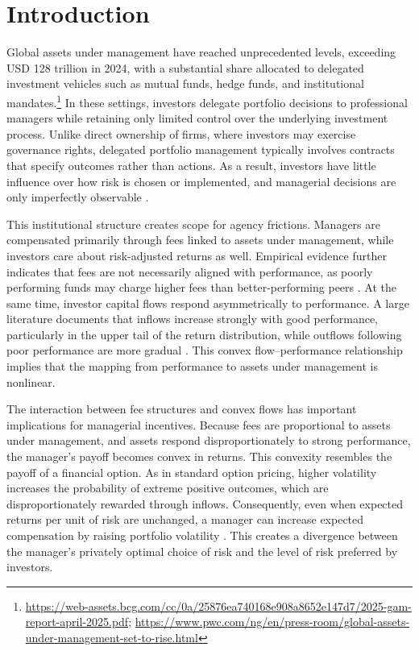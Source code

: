 \section{Introduction}\label{sec:introduction}

Global assets under management have reached unprecedented levels,
exceeding USD 128 trillion in 2024, with a substantial share allocated
to delegated investment vehicles such as mutual funds, hedge funds, and
institutional mandates.\footnote{\url{https://web-assets.bcg.com/cc/0a/25876ea740168e908a8652e147d7/2025-gam-report-april-2025.pdf};
  \url{https://www.pwc.com/ng/en/press-room/global-assets-under-management-set-to-rise.html}}
In these settings, investors delegate portfolio decisions to
professional managers while retaining only limited control over the
underlying investment process. Unlike direct ownership of firms, where
investors may exercise governance rights, delegated portfolio management
typically involves contracts that specify outcomes rather than actions.
As a result, investors have little influence over how risk is chosen or
implemented, and managerial decisions are only imperfectly observable
\citep{BebchukCohenHirst2017}.

This institutional structure creates scope for agency frictions.
Managers are compensated primarily through fees linked to assets under
management, while investors care about risk-adjusted returns as well.
Empirical evidence further indicates that fees are not necessarily
aligned with performance, as poorly performing funds may charge higher
fees than better-performing peers \citep{Gil-Bazo2008}. At the same
time, investor capital flows respond asymmetrically to performance. A
large literature documents that inflows increase strongly with good
performance, particularly in the upper tail of the return distribution,
while outflows following poor performance are more gradual
\citep{Ippolito1992ConsumerReaction, chevalier1997risk, sirri1998costly}.
This convex flow--performance relationship implies that the mapping from
performance to assets under management is nonlinear.

The interaction between fee structures and convex flows has important
implications for managerial incentives. Because fees are proportional to
assets under management, and assets respond disproportionately to strong
performance, the manager's payoff becomes convex in returns. This
convexity resembles the payoff of a financial option. As in standard
option pricing, higher volatility increases the probability of extreme
positive outcomes, which are disproportionately rewarded through
inflows. Consequently, even when expected returns per unit of risk are
unchanged, a manager can increase expected compensation by raising
portfolio volatility \citep{BrownHarlowStarks1996}. This creates a
divergence between the manager's privately optimal choice of risk and
the level of risk preferred by investors.

